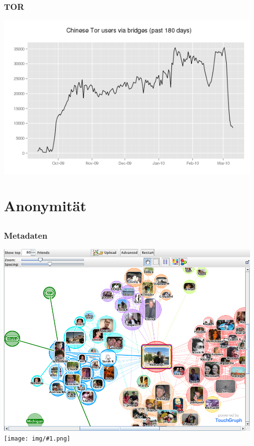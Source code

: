 \documentclass[12pt]{beamer}
\newcommand{\cc}[1]{\texttt{[image: img/\#1.png]}}
\begin{document}
\begin{frame}
    \frametitle{TOR}
    \includegraphics[height=0.7\textheight]{img/bridge2.png}
\end{frame}

\section{Anonymität}
\subsection{}

\begin{frame}
    \frametitle{Metadaten}
    \includegraphics[height=0.7\textheight]{img/socialgraph.jpg}
    \cc{by-sa}
\end{frame}
\end{document}
